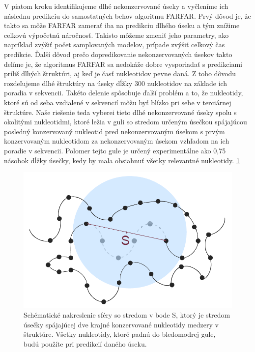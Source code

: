 \indent V piatom kroku identifikujeme dlhé nekonzervované úseky a vyčleníme ich následnu predikciu do samostatných behov algoritmu FARFAR. 
Prvý dôvod je, že takto sa môže FARFAR zamerať iba na predikciu dlhého úseku a tým znížime celkovú výpočetnú náročnosť. Takisto môžeme zmeniť jeho parametry, ako napríklad zvýšiť počet samplovaných modelov, prípade zvýšiť celkový čas predikcie. 
Ďalší dôvod prečo dopredikovanie nekonzervovaných úsekov takto delíme je, že algoritmus FARFAR sa nedokáže dobre vysporiadať s predikciami príliš dlhých štruktúri, aj keď je časť nukleotidov pevne daná. Z toho dôvodu rozdeľujeme dlhé štruktúry na úseky dĺžky 300 nukleotidov na základe ich poradia v sekvencii. Takéto delenie spôsobuje ďalší problém a to, že nukleotidy, ktoré sú od seba vzdialené v sekvencií môžu byť blízko pri sebe v terciárnej štruktúre. 
Naše riešenie teda vyberei tieto dlhé nekonzervované úseky spolu s okolitými nukleotidmi, ktoré ležia v guli so stredom určeným úsečkou spájajúcou posledný konzervovaný nukleotid pred nekonzervovaným úsekom s prvým konzervovaným nukleotidom za nekonzervovaným úsekom vzhľadom na ich poradie v sekvencii. Polomer tejto gule je určený experimentálne ako 0,75 násobok dĺžky úsečky, kedy by mala obsiahnuť všetky relevantné nukleotidy. \ref{obr3.2:sphere}

\begin{figure}%
\includegraphics[width=\textwidth]{../img/sphere}
\caption{Schématické nakreslenie sféry so stredom v bode S, ktorý je stredom úsečky spájajúcej dve krajné konzervované nukleotidy medzery v štruktúre. Všetky nukleotidy, ktoré padnú do bledomodrej gule, budú použíte pri predikcií daného úseku.}
\label{obr3.2:sphere}
\end{figure}

